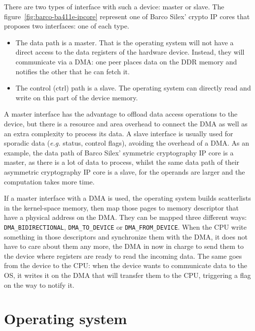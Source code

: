 There are two types of interface with such a device: master or slave.
The figure~\ref{fig:barco-ba411e-ipcore}  represent one of Barco Silex' crypto IP cores that proposes two interfaces: one of each type.
\begin{itemize}
	\item The data path is a master. That is the operating system will not have a direct access to the data registers of the hardware device. Instead, they will communicate via a DMA: one peer places data on the DDR memory and notifies the other that he can fetch it.
	\item The control (ctrl) path is a slave. The operating system can directly read and write on this part of the device memory.
\end{itemize}

A master interface has the advantage to offload data access operations to the device, but there is a resource and area overhead to connect the DMA as well as an extra complexity to process its data.
A slave interface is usually used for sporadic data (\textit{e.g.} status, control flags), avoiding the overhead of a DMA.
As an example, the data path of Barco Silex' symmetric cryptography IP core is a master, as there is a lot of data to process, whilst the same data path of their asymmetric cryptography IP core is a slave, for the operands are larger and the computation takes more time.\newline{}

If a master interface with a DMA is used, the operating system builds scatterlists in the kernel-space memory, then map those pages to memory descriptor that have a physical address on the DMA.
They can be mapped three different ways: \texttt{DMA\_BIDIRECTIONAL}, \texttt{DMA\_TO\_DEVICE} or \texttt{DMA\_FROM\_DEVICE}.
When the CPU write something in those descriptors and synchronize them with the DMA, it does not have to care about them any more, the DMA in now in charge to send them to the device where registers are ready to read the incoming data.
The same goes from the device to the CPU: when the device wants to communicate data to the OS, it writes it on the DMA that will transfer them to the CPU, triggering a flag on the way to notify it.



\section{Operating system}

